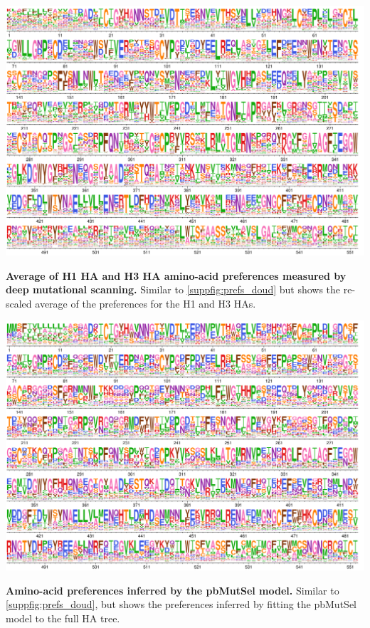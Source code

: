 \documentclass[11pt]{article}
\begin{document}
\begin{suppfig}[H]
\centerline{\includegraphics[width=\textwidth]{suppfig3.pdf}}
\caption{\label{suppfig:prefs_average}
\textbf{Average of H1 HA  and H3 HA amino-acid preferences measured by deep mutational scanning.}
Similar to \ref{suppfig:prefs_doud} but shows the re-scaled average of the preferences for the H1 and H3 HAs.
}
\end{suppfig}
\clearpage 

\begin{suppfig}[H]
\centerline{\includegraphics[width=\textwidth]{suppfig4.pdf}}
\caption{\label{suppfig:prefs_mutSel}
\textbf{Amino-acid preferences inferred by the pbMutSel model.}
Similar to \ref{suppfig:prefs_doud}, but shows the preferences inferred by fitting the pbMutSel model to the full HA tree.
}
\end{suppfig}
\clearpage 
\end{document}
